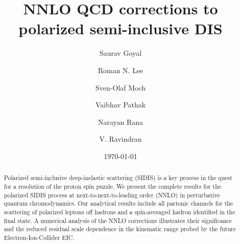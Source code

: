 \documentclass[%
 twocolumn,
 superscriptaddress,
 preprintnumbers,
 nofootinbib,
 amsmath,amssymb,
 aps,
 prl,
]{revtex4}
\begin{document}

\title{NNLO QCD corrections to polarized semi-inclusive DIS}
 

\author{Saurav Goyal}
\author{Roman N. Lee}
\author{Sven-Olaf Moch}
\author{Vaibhav Pathak}
\author{Narayan Rana}
\author{V. Ravindran}



\date{\today}

\begin{abstract}
Polarized semi-inclusive deep-inelastic scattering (SIDIS) is a key process in the quest for a resolution of the proton spin puzzle.
We present the complete results for the polarized SIDIS process at next-to-next-to-leading order (NNLO) in perturbative quantum chromodynamics.
Our analytical results include all partonic channels for the scattering of polarized leptons off hadrons and a spin-averaged hadron identified in the final state.
A numerical analysis of the NNLO corrections illustrates their significance and the reduced residual scale dependence in the kinematic range probed by the future Electron-Ion-Collider EIC.
\end{abstract}
 

\pacs{}%

\maketitle
\end{document}
